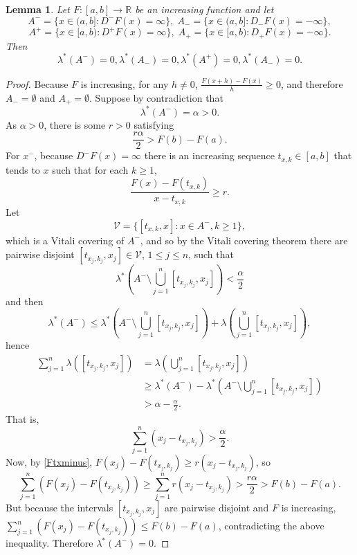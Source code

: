 \documentclass{article}
\newtheorem{lemma}[theorem]{Lemma}
\theoremstyle{definition}
\begin{document}
\begin{lemma}
Let $F:[a,b] \to \mathbb{R}$ be an increasing function and let
\[
A^- = \{x \in (a,b]: D^-F(x) =\infty\},
\; A_-=\{x \in (a,b]: D_-F(x)=-\infty\},
\]
\[
A^+=\{x \in [a,b):D^+F(x)=\infty\},
\; A_+=\{x \in [a,b): D_+F(x)=-\infty\}.
\] 
Then
\[
\lambda^*(A^-)=0, \lambda^*(A_-)=0, \lambda^*(A^+)=0, \lambda^*(A_-)=0.
\]
\end{lemma}
\begin{proof}
Because $F$ is increasing, for any $h \neq 0$, $\frac{F(x+h)-F(x)}{h} \geq 0$, and therefore
$A_-=\emptyset$ and $A_+=\emptyset$. 
Suppose by contradiction that 
\[
\lambda^*(A^-) = \alpha>0.
\]
As $\alpha>0$, there is some $r>0$ satisfying
\[
\frac{r\alpha}{2} > F(b)-F(a).
\]
For $x^-$, because $D^-F(x)=\infty$ there is an increasing sequence
$t_{x,k} \in [a,b]$ that tends to $x$ such that for each $k \geq 1$,
\begin{equation}
\frac{F(x)-F(t_{x,k})}{x-t_{x,k}} \geq r.
\label{Ftxminus}
\end{equation}
Let
\[
\mathcal{V} = \{[t_{x,k},x]: x \in A^-, k \geq 1\},
\]
which is a Vitali covering of $A^-$, and so by the Vitali covering theorem there are pairwise
disjoint $[t_{x_j,k_j}, x_j] \in \mathcal{V}$, $1 \leq j \leq n$, such that
\[
\lambda^*\left(A^- \setminus \bigcup_{j=1}^n [t_{x_j,k_j},x_j]\right) < \frac{\alpha}{2}
\]
and then
\[
\lambda^*(A^-) \leq \lambda^*\left(A^- \setminus \bigcup_{j=1}^n [t_{x_j,k_j},x_j]\right)
+\lambda\left( \bigcup_{j=1}^n [t_{x_j,k_j},x_j]\right),
\]
hence
\begin{align*}
\sum_{j=1}^n \lambda( [t_{x_j,k_j},x_j])&=\lambda\left( \bigcup_{j=1}^n [t_{x_j,k_j},x_j]\right)\\
&\geq  \lambda^*(A^-)  -  \lambda^*\left(A^- \setminus \bigcup_{j=1}^n [t_{x_j,k_j},x_j]\right)\\
&>\alpha - \frac{\alpha}{2}.
\end{align*}
That is,
\[
\sum_{j=1}^n (x_j-t_{x_j,k_j}) > \frac{\alpha}{2}.
\]
Now, by \eqref{Ftxminus}, $F(x_j)-F(t_{x_j,k_j}) \geq r(x_j-t_{x_j,k_j})$, so
\[
\sum_{j=1}^n (F(x_j)-F(t_{x_j,k_j})) \geq
\sum_{j=1}^n r(x_j-t_{x_j,k_j}) > \frac{r\alpha}{2}>F(b)-F(a).
\]
But because the intervals $[t_{x_j,k_j},x_j]$ are pairwise disjoint and $F$ is increasing,
$\sum_{j=1}^n (F(x_j)-F(t_{x_j,k_j})) \leq F(b)-F(a)$, contradicting the above inequality.
Therefore $\lambda^*(A^-)=0$. 


\end{proof}
\end{document}
